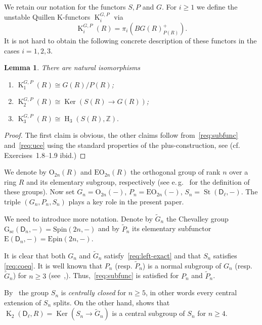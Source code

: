\documentclass[10pt,a4paper,twoside]{article}
\newtheorem{lemma}{Lemma}
\theoremstyle{remark}
\theoremstyle{definition}
\numberwithin{lemma}{section}
\numberwithin{prop}{section}
\numberwithin{corollary}{section}
\numberwithin{externaltheorem}{section}
\DeclareMathOperator{\Ker}{Ker}
\DeclareMathOperator{\St}{St}
\DeclareMathOperator{\HH}{H}
\DeclareMathOperator{\K}{K}
\newcommand{\GG}{\mathrm{G}_{\mathrm{sc}}}
\newcommand{\ZZ}{\mathbb{Z}}
\newcommand{\rD}{\mathsf{D}}
\numberwithin{equation}{section}
\begin{document}
We retain our notation for the functors $S, P$ and $G$.
For $i\geq 1$ we define the unstable Quillen K-functors $\K_{i}^{G, P}$ via
\begin{equation} \label{plus-constr} \K_i^{G,P}(R) = \pi_i(BG(R)^+_{P(R)}). \end{equation}
It is not hard to obtain the following concrete description of these functors in the cases $i=1,2,3$.
\begin{lemma}\label{lem:lowerKgroups} There are natural isomorphisms \begin{enumerate} [label=\normalfont(\arabic*)]
 \item $\K_1^{G,P}(R) \cong G(R) / P(R)$;
 \item $\K_2^{G,P}(R) \cong \Ker(S(R) \to G(R))$;
 \item $\K_3^{G,P}(R) \cong \HH_3(S(R), \ZZ).$ \end{enumerate} \end{lemma}
\begin{proof} The first claim is obvious, the other claims follow from~\ref{req:subfunc} and~\ref{req:uce} using the standard properties of the plus-construction, see \cite[\S~IV.1]{Kbook}   (cf. Exercises~1.8--1.9 ibid.) \end{proof}

We denote by $\mathrm{O}_{2n}(R)$ and $\mathrm{EO}_{2n}(R)$ the orthogonal group of rank $n$ over a ring $R$ and its elementary subgroup, respectively (see e.\,g.~\cite{Su82} for the definition of these groups).
Now set $G_n = \mathrm{O}_{2n}(-)$, $P_n = \mathrm{EO}_{2n}(-)$, $S_n = \St(\rD_\ell, -)$.
The triple $(G_n, P_n, S_n)$ plays a key role in the present paper.

We need to introduce more notation. Denote by $\widetilde{G}_n$ the Chevalley group $\GG(\rD_n, -) = \mathrm{Spin}(2n, -)$
 and by $\widetilde{P}_n$ its elementary subfunctor $\mathrm{E}(\rD_n, -) = \mathrm{Epin}(2n, -)$.

It is clear that both $G_n$ and $\widetilde{G}_n$ satisfy~\ref{req:left-exact} and that $S_n$ satisfies \ref{req:coeq}.
It is well known that $P_n$ (resp. $\widetilde{P}_n$) is a normal subgroup of $G_n$ (resp. $\widetilde{G}_n$) for $n\geq 3$ (see~\cite{Su82},\cite{Ta86}). Thus,~\ref{req:subfunc} is satisfied for $P_n$ and $\widetilde{P}_n$.

By~\cite[Corollary~5.4]{St71} the group $S_n$ is {\it centrally closed} for $n \geq 5$, in other words every central extension of $S_n$ splits.
On the other hand, \cite[Theorem~1]{LS17} shows that $\K_2(\rD_\ell, R) = \Ker(S_n \to \widetilde{G}_n)$ is a central subgroup of $S_n$ for $n\geq 4$. 
\end{document}

